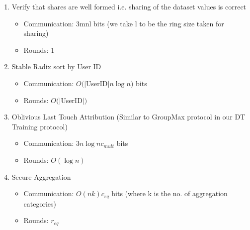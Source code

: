 \begin{enumerate}
    \item Verify that shares are well formed i.e. sharing of the dataset values is correct
    \begin{itemize}
        \item Communication: 3mnl bits (we take l to be the ring size taken for sharing)
        \item Rounds: 1
    \end{itemize}
    \item Stable Radix sort by User ID
    \begin{itemize}
        \item Communication: $O(|$UserID$|n\log n)$ bits
        \item Rounds: $O(|$UserID$|)$
    \end{itemize}
    \item Oblivious Last Touch Attribution (Similar to GroupMax protocol in our DT Training protocol)
    \begin{itemize}
        \item Communication: $3n\log n c_{mult}$ bits
        \item Rounds: $O(\log n)$
    \end{itemize}
    \item Secure Aggregation 
    \begin{itemize}
        \item Communication: $O(nk)c_{eq}$ bits (where k is the no. of aggregation categories) 
        \item Rounds: $r_{eq}$
    \end{itemize}
\end{enumerate}

